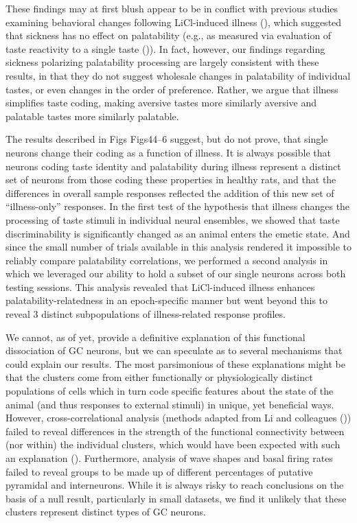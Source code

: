 \begin{refsection}
{These findings may at first blush appear to be in conflict with previous studies examining behavioral changes following LiCl-induced illness (\cite{spector1988a,baird2005a,eckel1996a}), which suggested that sickness has no effect on palatability (e.g., as measured via evaluation of taste reactivity to a single taste (\cite{spector1988a})). In fact, however, our findings regarding sickness polarizing palatability processing are largely consistent with these results, in that they do not suggest wholesale changes in palatability of individual tastes, or even changes in the order of preference. Rather, we argue that illness simplifies taste coding, making aversive tastes more similarly aversive and palatable tastes more similarly palatable.

The results described in Figs ​Figs44–6 suggest, but do not prove, that single neurons change their coding as a function of illness. It is always possible that neurons coding taste identity and palatability during illness represent a distinct set of neurons from those coding these properties in healthy rats, and that the differences in overall sample responses reflected the addition of this new set of “illness-only” responses. In the first test of the hypothesis that illness changes the processing of taste stimuli in individual neural ensembles, we showed that taste discriminability is significantly changed as an animal enters the emetic state. And since the small number of trials available in this analysis rendered it impossible to reliably compare palatability correlations, we performed a second analysis in which we leveraged our ability to hold a subset of our single neurons across both testing sessions. This analysis revealed that LiCl-induced illness enhances palatability-relatedness in an epoch-specific manner but went beyond this to reveal 3 distinct subpopulations of illness-related response profiles.

We cannot, as of yet, provide a definitive explanation of this functional dissociation of GC neurons, but we can speculate as to several mechanisms that could explain our results. The most parsimonious of these explanations might be that the clusters come from either functionally or physiologically distinct populations of cells which in turn code specific features about the state of the animal (and thus responses to external stimuli) in unique, yet beneficial ways. However, cross-correlational analysis (methods adapted from Li and colleagues (\cite{li2013a})) failed to reveal differences in the strength of the functional connectivity between (nor within) the individual clusters, which would have been expected with such an explanation (\cite{li2013a}). Furthermore, analysis of wave shapes and basal firing rates failed to reveal groups to be made up of different percentages of putative pyramidal and interneurons. While it is always risky to reach conclusions on the basis of a null result, particularly in small datasets, we find it unlikely that these clusters represent distinct types of GC neurons.

}
\end{refsection}
